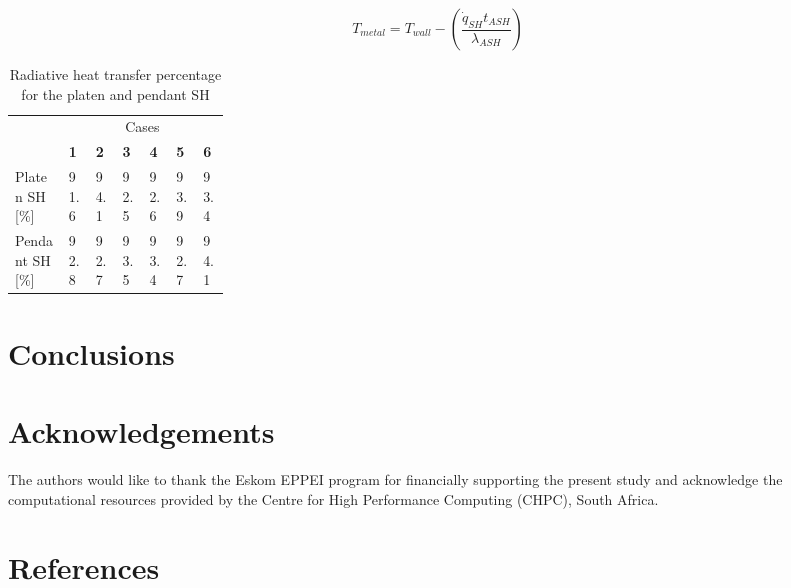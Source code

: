 \documentclass[review]{elsarticle}
\begin{document}
\begin{equation}
T_{metal} = T_{wall} - \left(\frac{\dot{q}_{SH}t_{ASH}}{\lambda_{ASH}}\right)
\end{equation}

\begin{table}[h!]
\centering
\caption{Radiative heat transfer percentage for the platen and pendant SH}
\label{fuel}
{\tabulinesep=1.2mm
\begin{tabularx}{\linewidth}{p{0.25\linewidth} XXXXXX}
\hline
&\multicolumn{6}{c}{Cases}\\
 & \textbf{1} & \textbf{2} & \textbf{3}& \textbf{4}&\textbf{5}&\textbf{6}\\
\hline
Platen SH [\%] & 91.6 & 94.1 & 92.5 & 92.6 & 93.9 & 93.4\\
Pendant SH [\%] & 92.8 & 92.7 & 93.5 & 93.4 & 92.7 & 94.1\\
\hline
\end{tabularx}}
\end{table}

\clearpage
\section{Conclusions}

\section*{Acknowledgements}
The authors would like to thank the Eskom EPPEI program for financially supporting the present study and acknowledge the computational resources provided by the Centre for High Performance Computing (CHPC), South Africa.

\section*{References}


\end{document}
